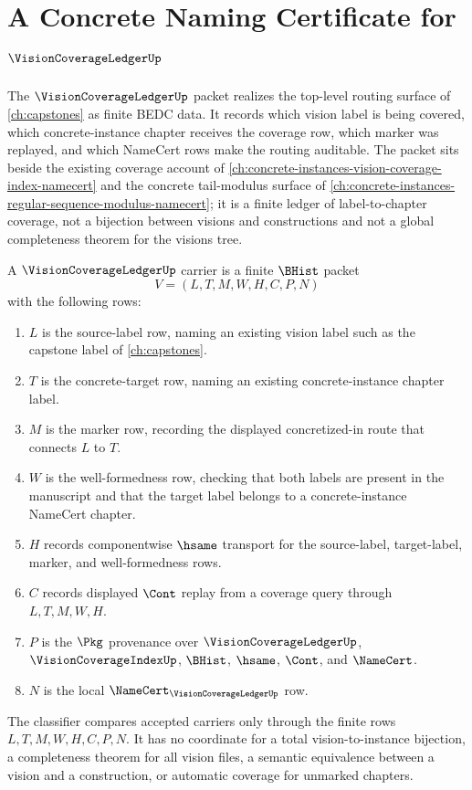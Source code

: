 \chapter{A Concrete Naming Certificate for $\VisionCoverageLedgerUp$}
\label{ch:concrete-instances-vision-coverage-ledger-namecert}

The $\VisionCoverageLedgerUp$ packet realizes the top-level routing surface of \autoref{ch:capstones} as finite BEDC data. It records which vision label is being covered, which concrete-instance chapter receives the coverage row, which marker was replayed, and which NameCert rows make the routing auditable. The packet sits beside the existing coverage account of \autoref{ch:concrete-instances-vision-coverage-index-namecert} and the concrete tail-modulus surface of \autoref{ch:concrete-instances-regular-sequence-modulus-namecert}; it is a finite ledger of label-to-chapter coverage, not a bijection between visions and constructions and not a global completeness theorem for the visions tree.

\begin{definition}
\label{def:vision-coverage-ledger-carrier}
A $\VisionCoverageLedgerUp$ carrier is a finite $\BHist$ packet
$$
V=(L,T,M,W,H,C,P,N)
$$
with the following rows:
\begin{enumerate}
\item $L$ is the source-label row, naming an existing vision label such as the capstone label of \autoref{ch:capstones}.
\item $T$ is the concrete-target row, naming an existing concrete-instance chapter label.
\item $M$ is the marker row, recording the displayed concretized-in route that connects $L$ to $T$.
\item $W$ is the well-formedness row, checking that both labels are present in the manuscript and that the target label belongs to a concrete-instance NameCert chapter.
\item $H$ records componentwise $\hsame$ transport for the source-label, target-label, marker, and well-formedness rows.
\item $C$ records displayed $\Cont$ replay from a coverage query through $L,T,M,W,H$.
\item $P$ is the $\Pkg$ provenance over $\VisionCoverageLedgerUp$, $\VisionCoverageIndexUp$, $\BHist$, $\hsame$, $\Cont$, and $\NameCert$.
\item $N$ is the local $\NameCert_{\VisionCoverageLedgerUp}$ row.
\end{enumerate}
The classifier compares accepted carriers only through the finite rows $L,T,M,W,H,C,P,N$. It has no coordinate for a total vision-to-instance bijection, a completeness theorem for all vision files, a semantic equivalence between a vision and a construction, or automatic coverage for unmarked chapters.
\end{definition}

